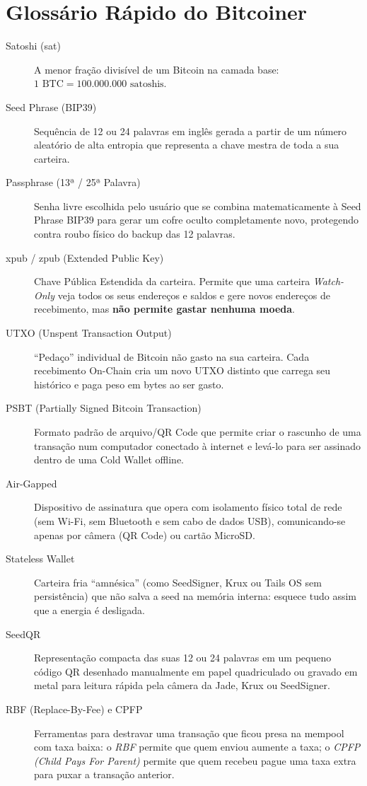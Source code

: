 \documentclass{pousadaguide}
\begin{document}
\clearpage
\section{Glossário Rápido do Bitcoiner}

\begin{description}
  \item[Satoshi (sat)] A menor fração divisível de um Bitcoin na camada base: $1\text{ BTC} = 100.000.000\text{ satoshis}$.
  \item[Seed Phrase (BIP39)] Sequência de 12 ou 24 palavras em inglês gerada a partir de um número aleatório de alta entropia que representa a chave mestra de toda a sua carteira.
  \item[Passphrase (13ª / 25ª Palavra)] Senha livre escolhida pelo usuário que se combina matematicamente à Seed Phrase BIP39 para gerar um cofre oculto completamente novo, protegendo contra roubo físico do backup das 12 palavras.
  \item[xpub / zpub (Extended Public Key)] Chave Pública Estendida da carteira. Permite que uma carteira \emph{Watch-Only} veja todos os seus endereços e saldos e gere novos endereços de recebimento, mas \textbf{não permite gastar nenhuma moeda}.
  \item[UTXO (Unspent Transaction Output)] ``Pedaço'' individual de Bitcoin não gasto na sua carteira. Cada recebimento On-Chain cria um novo UTXO distinto que carrega seu histórico e paga peso em bytes ao ser gasto.
  \item[PSBT (Partially Signed Bitcoin Transaction)] Formato padrão de arquivo/QR Code que permite criar o rascunho de uma transação num computador conectado à internet e levá-lo para ser assinado dentro de uma Cold Wallet offline.
  \item[Air-Gapped] Dispositivo de assinatura que opera com isolamento físico total de rede (sem Wi-Fi, sem Bluetooth e sem cabo de dados USB), comunicando-se apenas por câmera (QR Code) ou cartão MicroSD.
  \item[Stateless Wallet] Carteira fria ``amnésica'' (como SeedSigner, Krux ou Tails OS sem persistência) que não salva a seed na memória interna: esquece tudo assim que a energia é desligada.
  \item[SeedQR] Representação compacta das suas 12 ou 24 palavras em um pequeno código QR desenhado manualmente em papel quadriculado ou gravado em metal para leitura rápida pela câmera da Jade, Krux ou SeedSigner.
  \item[RBF (Replace-By-Fee) e CPFP] Ferramentas para destravar uma transação que ficou presa na mempool com taxa baixa: o \emph{RBF} permite que quem enviou aumente a taxa; o \emph{CPFP (Child Pays For Parent)} permite que quem recebeu pague uma taxa extra para puxar a transação anterior.
\end{description}
\end{document}
